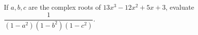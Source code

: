 If $a,b,c$ are the complex roots of $13x^3-12x^2+5x+3$, evaluate $\dfrac{1}{(1-a^2)(1-b^2)(1-c^2)}$.
